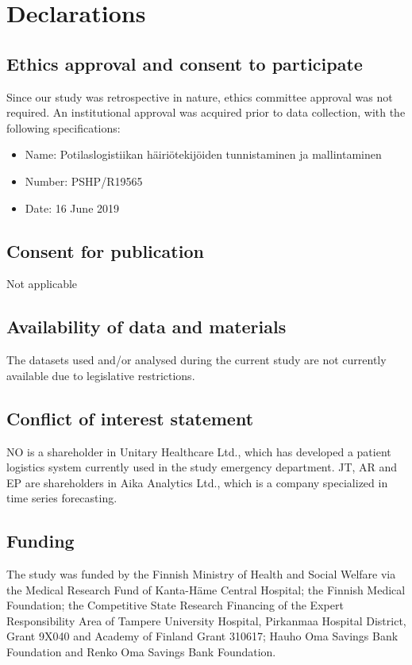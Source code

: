 \clearpage
\section*{Declarations}

\subsection*{Ethics approval and consent to participate}
Since our study was retrospective in nature, ethics committee approval was not required. An institutional approval was acquired prior to data collection, with the following specifications:
 
\begin{itemize}
    \item Name: Potilaslogistiikan häiriötekijöiden tunnistaminen ja mallintaminen
    \item Number: PSHP/R19565
    \item Date: 16 June 2019
\end{itemize}

\subsection*{Consent for publication}
Not applicable

\subsection*{Availability of data and materials}
The datasets used and/or analysed during the current study are not currently available due to legislative restrictions.

\subsection*{Conflict of interest statement}
NO is a shareholder in Unitary Healthcare Ltd., which has developed a patient logistics system currently used in the study emergency department. JT, AR and EP are shareholders in Aika Analytics Ltd., which is a company specialized in time series forecasting.

\subsection*{Funding}
The study was funded by the Finnish Ministry of Health and Social Welfare via the Medical Research Fund of Kanta-Häme Central Hospital; the Finnish Medical Foundation; the Competitive State Research Financing of the Expert Responsibility Area of Tampere University Hospital, Pirkanmaa Hospital District, Grant 9X040 and Academy of Finland Grant 310617; Hauho Oma Savings Bank Foundation and Renko Oma Savings Bank Foundation.


